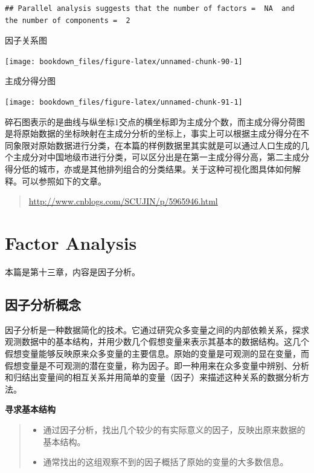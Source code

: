 \documentclass[]{ctexbook}
\providecommand{\tightlist}{%
  \setlength{\itemsep}{0pt}\setlength{\parskip}{0pt}}
\begin{document}
\begin{verbatim}
## Parallel analysis suggests that the number of factors =  NA  and the number of components =  2
\end{verbatim}

因子关系图

\texttt{[image: bookdown\_files/figure-latex/unnamed-chunk-90-1]}

主成分得分图

\texttt{[image: bookdown\_files/figure-latex/unnamed-chunk-91-1]}

碎石图表示的是曲线与纵坐标1交点的横坐标即为主成分个数，而主成分得分荷图是将原始数据的坐标映射在主成分分析的坐标上，事实上可以根据主成分得分在不同象限对原始数据进行分类，在本篇的样例数据里其实就是可以通过人口生成的几个主成分对中国地级市进行分类，可以区分出是在第一主成分得分高，第二主成分得分低的城市，亦或是其他排列组合的分类结果。关于这种可视化图具体如何解释。可以参照如下的文章。

\begin{quote}
\url{http://www.cnblogs.com/SCUJIN/p/5965946.html}
\end{quote}

\hypertarget{fa}{%
\chapter{Factor Analysis}\label{fa}}

本篇是第十三章，内容是因子分析。

\hypertarget{ux56e0ux5b50ux5206ux6790ux6982ux5ff5}{%
\section{因子分析概念}\label{ux56e0ux5b50ux5206ux6790ux6982ux5ff5}}

因子分析是一种数据简化的技术。它通过研究众多变量之间的内部依赖关系，探求观测数据中的基本结构，并用少数几个假想变量来表示其基本的数据结构。这几个假想变量能够反映原来众多变量的主要信息。原始的变量是可观测的显在变量，而假想变量是不可观测的潜在变量，称为因子。即一种用来在众多变量中辨别、分析和归结出变量间的相互关系并用简单的变量（因子）来描述这种关系的数据分析方法。

\textbf{寻求基本结构}

\begin{quote}
\begin{itemize}
\tightlist
\item
  通过因子分析，找出几个较少的有实际意义的因子，反映出原来数据的基本结构。
\item
  通常找出的这组观察不到的因子概括了原始的变量的大多数信息。
\end{itemize}
\end{quote}
\end{document}
